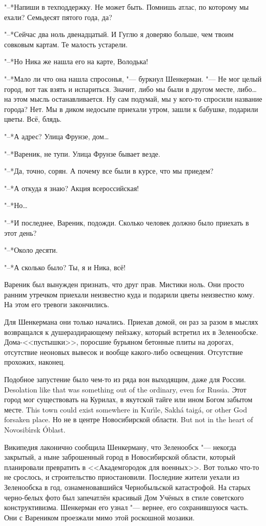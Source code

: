 "--*Напиши в техподдержку.
Не может быть.
Помнишь атлас, по которому мы ехали?
Семьдесят пятого года, да?

"--*Сейчас два ноль двенадцатый.
И Гуглю я доверяю больше, чем твоим совковым картам.
Те малость устарели.

"--*Но Ника же нашла его на карте, Володька!

"--*Мало ли что она нашла спросонья, "--- буркнул Шенкерман.
"--- Не мог целый город, вот так взять и испариться.
Значит, либо мы были в другом месте, либо\dots{} на этом мысль останавливается.
Ну сам подумай, мы у кого-то спросили название города?
Нет.
Мы в диком недосыпе приехали утром, зашли к бабушке, подарили цветы.
Всё, блядь.

"--*А адрес?
Улица Фрунзе, дом\dots{}

"--*Вареник, не тупи.
Улица Фрунзе бывает везде.

"--*Да, точно, сорян.
А почему все были в курсе, что мы приедем?

"--*А откуда я знаю?
Акция всероссийская!

"--*Но\dots{}

"--*И последнее, Вареник, подожди.
Сколько человек должно было приехать в этот день?

"--*Около десяти.

"--*А сколько было?
Ты, я и Ника, всё!

Вареник был вынужден признать, что друг прав.
Мистики ноль.
Они просто ранним утречком приехали неизвестно куда и подарили цветы неизвестно кому.
На этом его тревоги закончились.

Для Шенкермана они только начались.
Приехав домой, он раз за разом в мыслях возвращался к душераздирающему пейзажу, который встретил их в Зеленообске.
Дома-<<пустышки>>, поросшие бурьяном бетонные плиты на дорогах, отсутствие неоновых вывесок и вообще какого-либо освещения.
Отсутствие прохожих, наконец.

{Подобное запустение было чем-то из ряда вон выходящим, даже для России.}
{Desolation like that was something out of the ordinary, even for Russia.}
{Этот город мог существовать на Курилах, в якутской тайге или ином Богом забытом месте.}
{This town could exist somewhere in Kur\'{\i}le, Sakh\'a taig\'a, or other God forsaken place.}
{Но не в центре Новосибирской области.}
{But not in the heart of Novosib\'{\i}rsk \'Oblast.}

Википедия лаконично сообщила Шенкерману, что Зеленообск "--- некогда закрытый, а ныне заброшенный город в Новосибирской области, который планировали превратить в <<Академгородок для военных>>.
Вот только что-то не срослось, и строительство приостановили.
Последние жители уехали из Зеленообска в год, ознаменовавшийся Чернобыльской катастрофой.
На старых черно-белых фото был запечатлён красивый Дом Учёных в стиле советского конструктивизма.
Шенкерман его узнал "--- вернее, его сохранившуюся часть.
Они с Вареником проезжали мимо этой роскошной мозаики.

